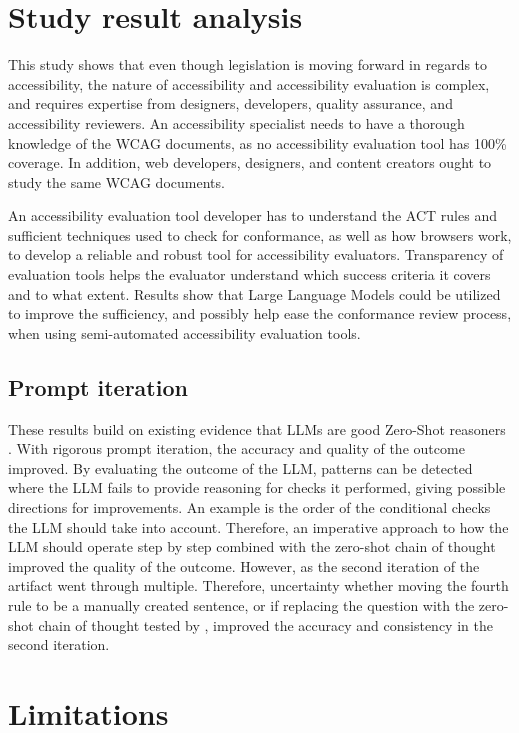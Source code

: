 \section{Study result analysis}

This study shows that even though legislation is moving forward in regards to accessibility, the nature of accessibility and accessibility evaluation is complex, and requires expertise from designers, developers, quality assurance, and accessibility reviewers. An accessibility specialist needs to have a thorough knowledge of the WCAG documents, as no accessibility evaluation tool has 100\% coverage. In addition, web developers, designers, and content creators ought to study the same WCAG documents. 

An accessibility evaluation tool developer has to understand the ACT rules and sufficient techniques used to check for conformance, as well as how browsers work, to develop a reliable and robust tool for accessibility evaluators. Transparency of evaluation tools helps the evaluator understand which success criteria it covers and to what extent. Results show that Large Language Models could be utilized to improve the sufficiency, and possibly help ease the conformance review process, when using semi-automated accessibility evaluation tools. 

\subsection{Prompt iteration}

These results build on existing evidence that LLMs are good Zero-Shot reasoners \citep{kojima2023large}. With rigorous prompt iteration, the accuracy and quality of the outcome improved. By evaluating the outcome of the LLM, patterns can be detected where the LLM fails to provide reasoning for checks it performed, giving possible directions for improvements. An example is the order of the conditional checks the LLM should take into account. Therefore, an imperative approach to how the LLM should operate step by step combined with the zero-shot chain of thought improved the quality of the outcome. However, as the second iteration of the artifact went through multiple. Therefore, uncertainty whether moving the fourth rule to be a manually created sentence, or if replacing the question with the zero-shot chain of thought tested by \textcite{kojima2023large}, improved the accuracy and consistency in the second iteration.

\section{Limitations}

